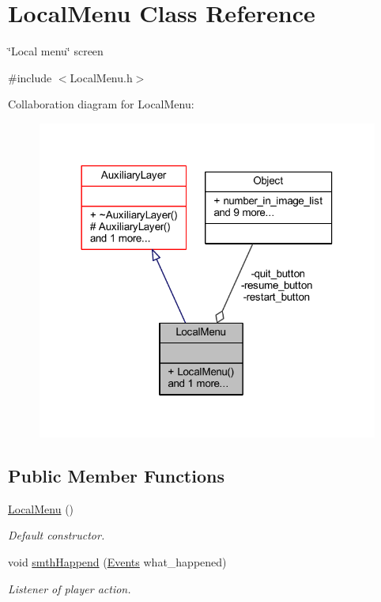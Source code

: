 \hypertarget{class_local_menu}{}\section{Local\+Menu Class Reference}
\label{class_local_menu}


\char`\"{}\+Local menu\char`\"{} screen  




{\ttfamily \#include $<$Local\+Menu.\+h$>$}



Collaboration diagram for Local\+Menu\+:
\nopagebreak
\begin{figure}[H]
\begin{center}
\leavevmode
\includegraphics[width=318pt]{class_local_menu__coll__graph}
\end{center}
\end{figure}
\subsection*{Public Member Functions}
\begin{DoxyCompactItemize}
\item 
\mbox{\label{class_local_menu_a5e20a17475cf56d630a80e6972b44261}} 
\hyperlink{class_local_menu_a5e20a17475cf56d630a80e6972b44261}{Local\+Menu} ()
\begin{DoxyCompactList}\small\item\em Default constructor. \end{DoxyCompactList}\item 
void \hyperlink{class_local_menu_ad6db1f0ae5757a4e25269d40f6e369af}{smth\+Happend} (\hyperlink{_events_8h_af60e00b78607064c5be6aa9397ea49c1}{Events} what\+\_\+happened)
\begin{DoxyCompactList}\small\item\em Listener of player action. \end{DoxyCompactList}\end{DoxyCompactItemize}

